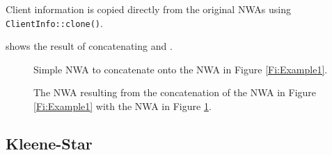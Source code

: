 
Client information is copied directly from the original NWAs using
\texttt{ClientInfo::clone()}.

 shows the result of concatenating  and
.



\begin{figure}[p]
  \centering
  \caption{Simple NWA to concatenate onto the NWA in Figure \ref{Fi:Example1}.}
  \label{Fi:Concat1}
\end{figure}

\begin{figure}[p]
  \centering
  \caption{The NWA resulting from the concatenation of the NWA in Figure
    \ref{Fi:Example1} with the NWA in Figure \ref{Fi:Concat1}.}
  \label{Fi:Concat2}
\end{figure}


\subsection{Kleene-Star}
\label{Se:Star}

